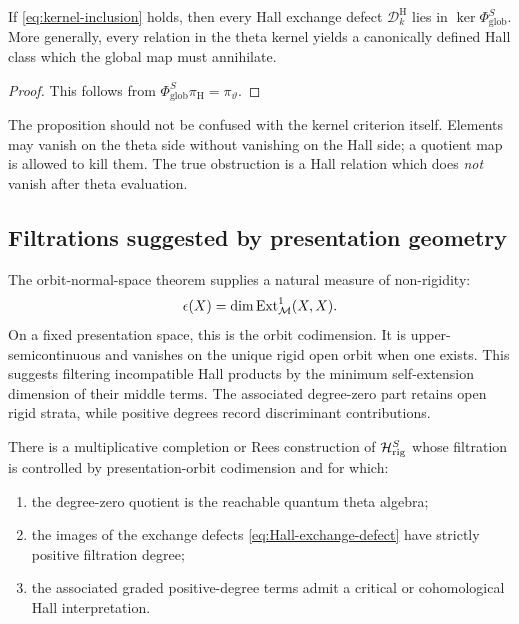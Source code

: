 \begin{proposition}
\label{prop:exchange-defects}
If \cref{eq:kernel-inclusion} holds, then every Hall exchange defect
$\mathcal D_k^{\mathrm H}$ lies in
$\ker\Phi_{\mathrm{glob}}^S$.  More generally, every relation in the theta
kernel yields a canonically defined Hall class which the global map must
annihilate.
\end{proposition}

\begin{proof}
This follows from
$\Phi_{\mathrm{glob}}^S\pi_{\mathrm H}=\pi_\vartheta$.
\end{proof}

The proposition should not be confused with the kernel criterion itself.
Elements may vanish on the theta side without vanishing on the Hall side; a
quotient map is allowed to kill them.  The true obstruction is a Hall relation
which does \emph{not} vanish after theta evaluation.

\subsection{Filtrations suggested by presentation geometry}

The orbit-normal-space theorem supplies a natural measure of non-rigidity:
\[
 \epsilon(X)=\dim\operatorname{Ext}^1_{\mathcal M}(X,X).
\]
On a fixed presentation space, this is the orbit codimension.  It is
upper-semicontinuous and vanishes on the unique rigid open orbit when one
exists.  This suggests filtering incompatible Hall products by the minimum
self-extension dimension of their middle terms.  The associated degree-zero
part retains open rigid strata, while positive degrees record discriminant
contributions.

\begin{conjecture}
\label{conj:codimension-filtration}
There is a multiplicative completion or Rees construction of
$\mathcal H_{\mathrm{rig}}^S$ whose filtration is controlled by presentation-orbit
codimension and for which:
\begin{enumerate}[label=(\roman*),leftmargin=2.3em]
\item the degree-zero quotient is the reachable quantum theta algebra;
\item the images of the exchange defects
      \cref{eq:Hall-exchange-defect} have strictly positive filtration degree;
\item the associated graded positive-degree terms admit a critical or
      cohomological Hall interpretation.
\end{enumerate}
\end{conjecture}

